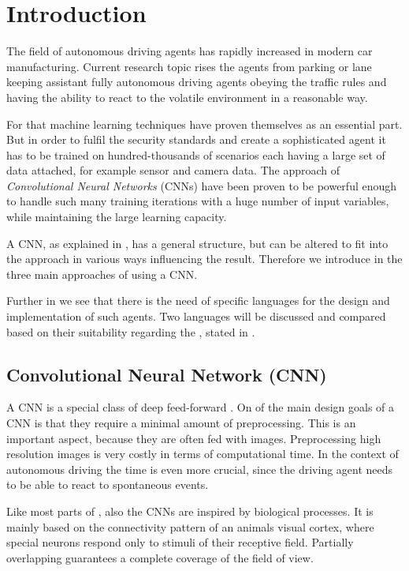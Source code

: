 \chapter{Introduction}

The field of autonomous driving agents has rapidly increased in modern car manufacturing. Current research topic rises the agents from parking or lane keeping assistant fully autonomous driving agents obeying the traffic rules and having the ability to react to the volatile environment in a reasonable way.

For that machine learning techniques have proven themselves as an essential part. But in order to fulfil the security standards and create a sophisticated agent it has to be trained on hundred-thousands of scenarios each having a large set of data attached, for example sensor and camera data.
The approach of \textit{Convolutional Neural Networks} (CNNs) have been proven to be powerful enough to handle such many training iterations with a huge number of input variables, while maintaining the large learning capacity. \cite{krizhevsky2012imagenet}

A CNN, as explained in , has a general structure, but can be altered to fit into the approach in various ways influencing the result. Therefore we introduce in  the three main approaches of using a CNN.

Further in  we see that there is the need of specific languages for the design and implementation of such agents. Two languages will be discussed and compared based on their suitability regarding the \alexnet, stated in  .

\section{Convolutional Neural Network (CNN)}\label{sec:CNN}

A CNN is a special class of deep feed-forward \nns. On of the main design goals of a CNN is that they require a minimal amount of preprocessing. This is an important aspect, because they are often fed with images. Preprocessing high resolution images is very costly in terms of computational time. In the context of autonomous driving the time is even more crucial, since the driving agent needs to be able to react to spontaneous events.

Like most parts of \nns, also the CNNs are inspired by biological processes. It is mainly based on the connectivity pattern of an animals visual cortex, where special neurons respond only to stimuli of their receptive field. Partially overlapping guarantees a complete coverage of the field of view. \cite{wiki:CNN}

